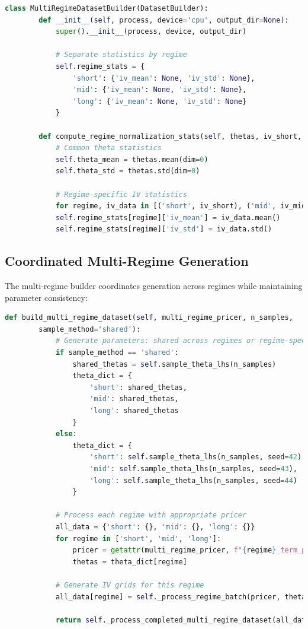 	\begin{lstlisting}[language=Python, basicstyle=\ttfamily\footnotesize, 
		frame=single, rulecolor=\color{black!20}, backgroundcolor=\color{gray!5},
		showstringspaces=false, breaklines=true, columns=fullflexible]
		class MultiRegimeDatasetBuilder(DatasetBuilder):
		def __init__(self, process, device='cpu', output_dir=None):
			super().__init__(process, device, output_dir)
			
			# Separate statistics by regime
			self.regime_stats = {
				'short': {'iv_mean': None, 'iv_std': None},
				'mid': {'iv_mean': None, 'iv_std': None},
				'long': {'iv_mean': None, 'iv_std': None}
			}
		
		def compute_regime_normalization_stats(self, thetas, iv_short, iv_mid, iv_long):
			# Common theta statistics
			self.theta_mean = thetas.mean(dim=0)
			self.theta_std = thetas.std(dim=0)
		
			# Regime-specific IV statistics
			for regime, iv_data in [('short', iv_short), ('mid', iv_mid), ('long', iv_long)]:
			self.regime_stats[regime]['iv_mean'] = iv_data.mean()
			self.regime_stats[regime]['iv_std'] = iv_data.std()
	\end{lstlisting}
	
	\subsection{Coordinated Multi-Regime Generation}
	
	The multi-regime builder coordinates generation across regimes while maintaining parameter consistency:
	
	\begin{lstlisting}[language=Python, basicstyle=\ttfamily\footnotesize, 
		frame=single, rulecolor=\color{black!20}, backgroundcolor=\color{gray!5},
		showstringspaces=false, breaklines=true, columns=fullflexible]
		def build_multi_regime_dataset(self, multi_regime_pricer, n_samples,
		sample_method='shared'):
			# Generate parameters: shared across regimes or regime-specific
			if sample_method == 'shared':
				shared_thetas = self.sample_theta_lhs(n_samples)
				theta_dict = {
					'short': shared_thetas,
					'mid': shared_thetas,
					'long': shared_thetas
				}
			else:
				theta_dict = {
					'short': self.sample_theta_lhs(n_samples, seed=42),
					'mid': self.sample_theta_lhs(n_samples, seed=43),
					'long': self.sample_theta_lhs(n_samples, seed=44)
				}
			
			# Process each regime with appropriate pricer
			all_data = {'short': {}, 'mid': {}, 'long': {}}
			for regime in ['short', 'mid', 'long']:
				pricer = getattr(multi_regime_pricer, f"{regime}_term_pricer")
				thetas = theta_dict[regime]
			
			# Generate IV grids for this regime
			all_data[regime] = self._process_regime_batch(pricer, thetas, regime)
			
			return self._process_completed_multi_regime_dataset(all_data, normalize)
	\end{lstlisting}
	
